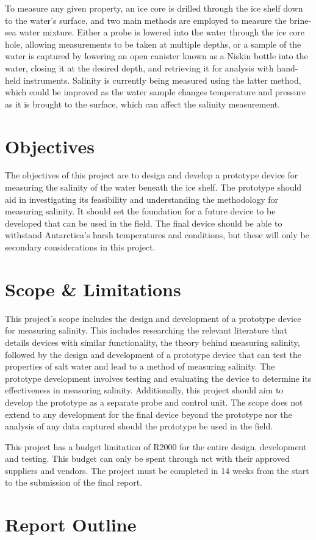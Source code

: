 To measure any given property, an ice core is drilled through the ice shelf down to the water's surface, and two main methods are employed to measure the brine-sea water mixture.
Either a probe is lowered into the water through the ice core hole, allowing measurements to be taken at multiple depths, or a sample of the water is captured by lowering an open canister known as a Niskin bottle into the water, closing it at the desired depth, and retrieving it for analysis with hand-held instruments.
Salinity is currently being measured using the latter method, which could be improved as the water sample changes temperature and pressure as it is brought to the surface, which can affect the salinity measurement.

\section{Objectives}
The objectives of this project are to design and develop a prototype device for measuring the salinity of the water beneath the ice shelf.
The prototype should aid in investigating its feasibility and understanding the methodology for measuring salinity.
It should set the foundation for a future device to be developed that can be used in the field.
The final device should be able to withstand Antarctica's harsh temperatures and conditions, but these will only be secondary considerations in this project.


\section{Scope \& Limitations}
This project's scope includes the design and development of a prototype device for measuring salinity.
This includes researching the relevant literature that details devices with similar functionality, the theory behind measuring salinity, followed by the design and development of a prototype device that can test the properties of salt water and lead to a method of measuring salinity.
The prototype development involves testing and evaluating the device to determine its effectiveness in measuring salinity.
Additionally, this project should aim to develop the prototype as a separate probe and control unit.
The scope does not extend to any development for the final device beyond the prototype nor the analysis of any data captured should the prototype be used in the field.

This project has a budget limitation of R2000 for the entire design, development and testing.
This budget can only be spent through \gls{uct} with their approved suppliers and vendors.
The project must be completed in 14 weeks from the start to the submission of the final report.

\section{Report Outline}
\lipsum[1]